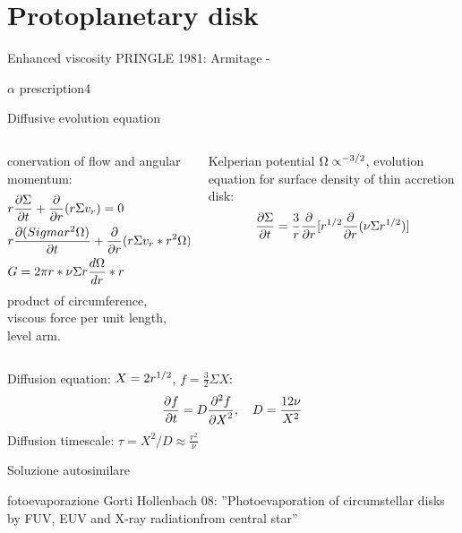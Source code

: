 \section{Protoplanetary disk}

\begin{wordonframe}{Enhanced viscosity}
PRINGLE 1981:
Armitage - 
\end{wordonframe}

\begin{frame}{$\alpha$ prescription4}

\end{frame}

\begin{frame}{Diffusive evolution equation}
\begin{columns}[T]\begin{column}{0.5\textwidth}
conervation of flow and angular momentum:
\begin{align*}
&r\PDy{t}{\Sigma}+\PDof{r}(r\Sigma v_r)=0\\
&r\PDy{t}{(Sigma r^2\Omega)}+\PDof{r}(r\Sigma v_r*r^2\Omega)=\frac{1}{2\pi}\PDy{r}{G}\\
&G=2\pi r*\nu\Sigma r\TDy{r}{\Omega}*r
\end{align*}
product of circumference, viscous force per unit length, level arm.
\end{column}\begin{column}{0.5\textwidth}
Kelperian potential $\Omega\propto\expy{-3/2}$, evolution equation for  surface density of thin accretion disk:
\[\PDy{t}{\Sigma}=\frac{3}{r}\PDof{r}[r\expy{1/2}\PDof{r}(\nu\Sigma r\expy{1/2})]\]
\end{column}\end{columns}
Diffusion equation: $X=2r\expy{1/2}$, $f=\frac{3}{2}\Sigma X$:
\[\PDy{t}{f}=D\PtwoDy{X}{f},\quad D=\frac{12\nu}{X^2}\]
Diffusion timescale: $\tau=X^2/D\approx\frac{r^2}{\nu}$
\end{frame}

\begin{frame}{Soluzione autosimilare}

\end{frame}

\begin{frame}{fotoevaporazione}
Gorti Hollenbach 08: ''Photoevaporation of circumstellar disks by FUV, EUV and X-ray radiationfrom central star''
\end{frame}